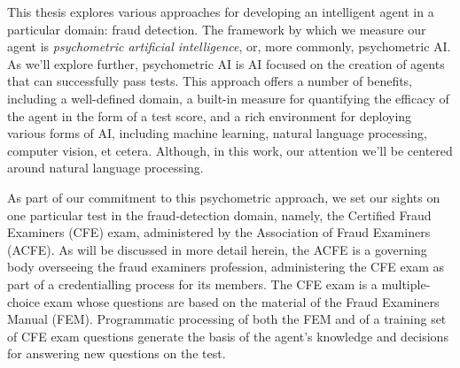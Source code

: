  
 
This thesis explores various approaches for developing an intelligent agent in a
particular domain: fraud detection.  The 
framework by which we measure our agent is \textit{psychometric artificial intelligence}, or, 
more commonly, psychometric AI.  As we'll explore further, psychometric AI is AI
focused on the creation of agents that can successfully pass tests.  This approach offers a number of
benefits, including a well-defined domain, a built-in measure for quantifying the efficacy
of the agent in the form of a test score, and a rich environment for deploying various
forms of AI, including machine learning, natural language processing, computer vision,
et cetera.  Although, in this work, our attention we'll be centered around natural language 
processing.

As part of our commitment to this psychometric approach, we set our sights on one
particular test
in the fraud-detection domain, namely, the 
Certified Fraud Examiners (CFE) exam, administered by the Association of Fraud Examiners 
(ACFE).  As will be discussed in more detail herein, the ACFE is a governing body overseeing
the fraud examiners profession, administering the CFE exam as part of a credentialling
process for its members.  The CFE exam is a multiple-choice exam whose questions
are based on the material of the Fraud Examiners Manual (FEM).  Programmatic processing of both the FEM and of a training set of CFE exam 
questions generate the basis of the agent's knowledge and decisions for answering new
questions on the test.

